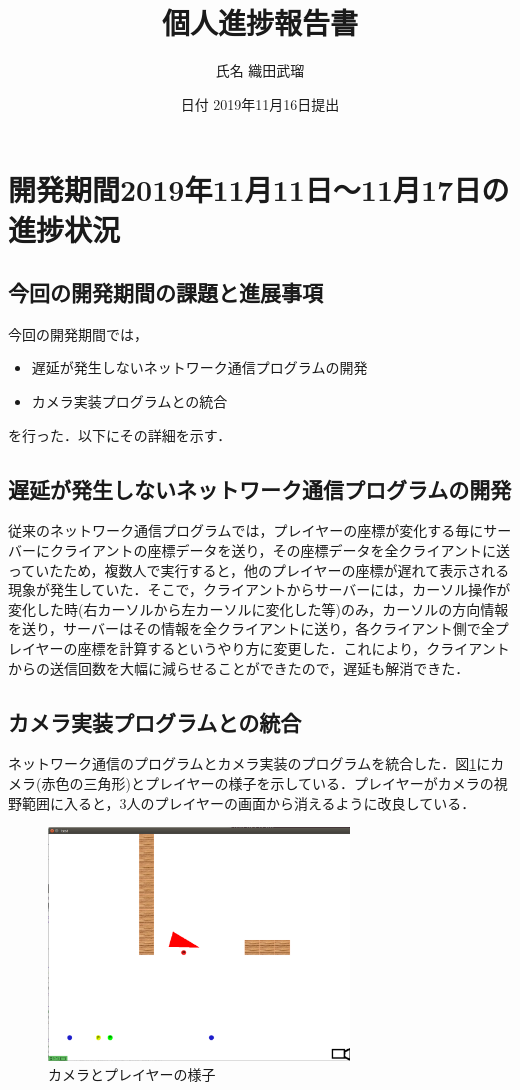 \documentclass{jarticle}
\title{個人進捗報告書}
\author{氏名 織田武瑠}
\date{日付 2019年11月16日提出}
\begin{document}
\maketitle  %

\section{開発期間2019年11月11日〜11月17日の進捗状況}
\subsection{今回の開発期間の課題と進展事項}
今回の開発期間では，
\begin{itemize}
  \item 遅延が発生しないネットワーク通信プログラムの開発
  \item カメラ実装プログラムとの統合
\end{itemize}
を行った．以下にその詳細を示す．

\subsection{遅延が発生しないネットワーク通信プログラムの開発}
従来のネットワーク通信プログラムでは，プレイヤーの座標が変化する毎にサーバーにクライアントの座標データを送り，その座標データを全クライアントに送っていたため，複数人で実行すると，他のプレイヤーの座標が遅れて表示される現象が発生していた．そこで，クライアントからサーバーには，カーソル操作が変化した時(右カーソルから左カーソルに変化した等)のみ，カーソルの方向情報を送り，サーバーはその情報を全クライアントに送り，各クライアント側で全プレイヤーの座標を計算するというやり方に変更した．これにより，クライアントからの送信回数を大幅に減らせることができたので，遅延も解消できた．

\subsection{カメラ実装プログラムとの統合} 
ネットワーク通信のプログラムとカメラ実装のプログラムを統合した．図\ref{fig:repo1}にカメラ(赤色の三角形)とプレイヤーの様子を示している．プレイヤーがカメラの視野範囲に入ると，3人のプレイヤーの画面から消えるように改良している．

\begin{figure}[H]
\begin{center}
\includegraphics[width=8cm]{pic1.eps}
\caption{カメラとプレイヤーの様子}
\label{fig:repo1}
\end{center}
\end{figure}
\end{document}
